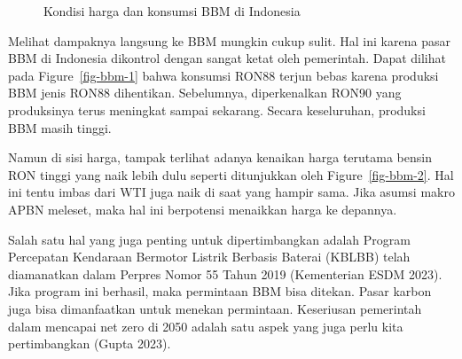 \documentclass[
  a4paper,
  DIV=11,
  numbers=noendperiod]{scrreprt}
\begin{document}
\begin{figure}

\begin{minipage}[t]{0.50\linewidth}

{\centering 


}

\end{minipage}%
%
\begin{minipage}[t]{0.50\linewidth}

{\centering 


}

\end{minipage}%

\caption{\label{fig-bbm}Kondisi harga dan konsumsi BBM di Indonesia}

\end{figure}

Melihat dampaknya langsung ke BBM mungkin cukup sulit. Hal ini karena
pasar BBM di Indonesia dikontrol dengan sangat ketat oleh pemerintah.
Dapat dilihat pada Figure~\ref{fig-bbm-1} bahwa konsumsi RON88 terjun
bebas karena produksi BBM jenis RON88 dihentikan. Sebelumnya,
diperkenalkan RON90 yang produksinya terus meningkat sampai sekarang.
Secara keseluruhan, produksi BBM masih tinggi.

Namun di sisi harga, tampak terlihat adanya kenaikan harga terutama
bensin RON tinggi yang naik lebih dulu seperti ditunjukkan oleh
Figure~\ref{fig-bbm-2}. Hal ini tentu imbas dari WTI juga naik di saat
yang hampir sama. Jika asumsi makro APBN meleset, maka hal ini
berpotensi menaikkan harga ke depannya.

Salah satu hal yang juga penting untuk dipertimbangkan adalah Program
Percepatan Kendaraan Bermotor Listrik Berbasis Baterai (KBLBB) telah
diamanatkan dalam Perpres Nomor 55 Tahun 2019 (Kementerian ESDM 2023).
Jika program ini berhasil, maka permintaan BBM bisa ditekan. Pasar
karbon juga bisa dimanfaatkan untuk menekan permintaan. Keseriusan
pemerintah dalam mencapai net zero di 2050 adalah satu aspek yang juga
perlu kita pertimbangkan (Gupta 2023).
\end{document}
